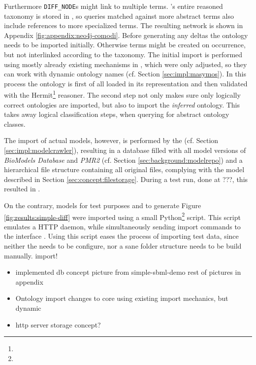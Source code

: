 Furthermore \texttt{DIFF\_NODE}s might link to multiple \comodi terms. \comodi's entire reasoned taxonomy is stored in \masymos, so queries matched against more abstract terms also include references to more specialized terms. The resulting network is shown in Appendix \ref{fig:appendix:neo4j-comodi}.
Before generating any deltas the \comodi ontology needs to be imported initially. Otherwise terms might be created on occurrence, but not interlinked according to the taxonomy.
The initial import is performed using mostly already existing mechanisms in \masymos, which were only adjusted, so they can work with dynamic ontology names (cf. Section \ref{sec:impl:masymos}). In this process the ontology is first of all loaded in its \owl representation and then validated with the Hermit\footnote{} reasoner. The second step not only makes sure only logically correct ontologies are imported, but also to import the \emph{inferred} ontology. This takes away logical classification steps, when querying for abstract ontology classes.

The import of actual models, however, is performed by the \modelcrawler (cf. Section \ref{sec:impl:modelcrawler}), resulting in a \masymos database filled with all model versions of \emph{BioModels Database} and \emph{PMR2} (cf. Section \ref{sec:background:modelrepo}) and a hierarchical file structure containing all original files, complying with the model described in Section \ref{sec:concept:filestorage}.
During a test run, done at ???, this resulted in .

On the contrary, models for test purposes and to generate Figure \ref{fig:results:simple-diff} were imported using a small Python\footnote{} script. This script emulates a HTTP daemon, while simultaneously sending import commands to the \masymos \rest interface \morre. Using this script eases the process of importing test data, since neither the \modelcrawler needs to be configure, nor a sane folder structure needs to be build manually.
import!




\begin{itemize}
	\item implemented db concept
		\subitem picture from simple-sbml-demo
		\subitem rest of pictures in appendix
	\item Ontology import
		\subitem changes to \masymos core
		\subitem using existing import mechanics, but dynamic
	\item http server storage concept?
\end{itemize}




